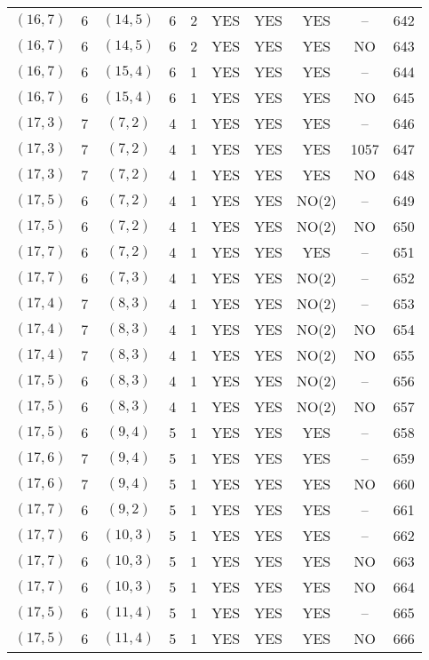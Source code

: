 \begin{longtable}{|c|c|c|c|c|c|c|c|c|c|}
$(16, 7)$ & 6 & $(14, 5)$ & 6 & 2 & YES & YES & YES & -- & 642\\
$(16, 7)$ & 6 & $(14, 5)$ & 6 & 2 & YES & YES & YES & NO & 643\\
$(16, 7)$ & 6 & $(15, 4)$ & 6 & 1 & YES & YES & YES & -- & 644\\
$(16, 7)$ & 6 & $(15, 4)$ & 6 & 1 & YES & YES & YES & NO & 645\\
$(17, 3)$ & 7 & $(7, 2)$ & 4 & 1 & YES & YES & YES & -- & 646\\
$(17, 3)$ & 7 & $(7, 2)$ & 4 & 1 & YES & YES & YES & 1057 & 647\\
$(17, 3)$ & 7 & $(7, 2)$ & 4 & 1 & YES & YES & YES & NO & 648\\
$(17, 5)$ & 6 & $(7, 2)$ & 4 & 1 & YES & YES & NO(2) & -- & 649\\
$(17, 5)$ & 6 & $(7, 2)$ & 4 & 1 & YES & YES & NO(2) & NO & 650\\
$(17, 7)$ & 6 & $(7, 2)$ & 4 & 1 & YES & YES & YES & -- & 651\\
$(17, 7)$ & 6 & $(7, 3)$ & 4 & 1 & YES & YES & NO(2) & -- & 652\\
$(17, 4)$ & 7 & $(8, 3)$ & 4 & 1 & YES & YES & NO(2) & -- & 653\\
$(17, 4)$ & 7 & $(8, 3)$ & 4 & 1 & YES & YES & NO(2) & NO & 654\\
$(17, 4)$ & 7 & $(8, 3)$ & 4 & 1 & YES & YES & NO(2) & NO & 655\\
$(17, 5)$ & 6 & $(8, 3)$ & 4 & 1 & YES & YES & NO(2) & -- & 656\\
$(17, 5)$ & 6 & $(8, 3)$ & 4 & 1 & YES & YES & NO(2) & NO & 657\\
$(17, 5)$ & 6 & $(9, 4)$ & 5 & 1 & YES & YES & YES & -- & 658\\
$(17, 6)$ & 7 & $(9, 4)$ & 5 & 1 & YES & YES & YES & -- & 659\\
$(17, 6)$ & 7 & $(9, 4)$ & 5 & 1 & YES & YES & YES & NO & 660\\
$(17, 7)$ & 6 & $(9, 2)$ & 5 & 1 & YES & YES & YES & -- & 661\\
$(17, 7)$ & 6 & $(10, 3)$ & 5 & 1 & YES & YES & YES & -- & 662\\
$(17, 7)$ & 6 & $(10, 3)$ & 5 & 1 & YES & YES & YES & NO & 663\\
$(17, 7)$ & 6 & $(10, 3)$ & 5 & 1 & YES & YES & YES & NO & 664\\
$(17, 5)$ & 6 & $(11, 4)$ & 5 & 1 & YES & YES & YES & -- & 665\\
$(17, 5)$ & 6 & $(11, 4)$ & 5 & 1 & YES & YES & YES & NO & 666\\

\end{longtable}
